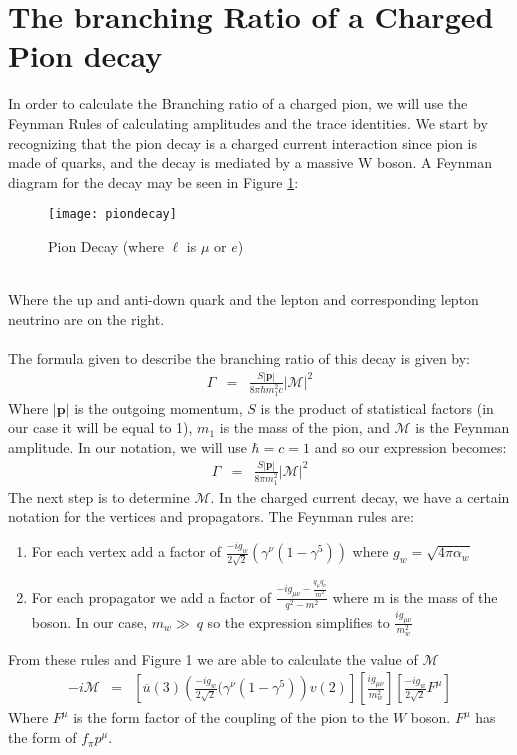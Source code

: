 \documentclass[12pt]{article}
\def \bea{\begin{eqnarray}}
\def \eea{\end{eqnarray}}
\def \({\left(}
\def \){\right)}
\def \[{\left[}
\def \]{\right]}
\def \ou{\overline{u}}
\def \al{\alpha}
\def \ga{\gamma}
\def \Ga{\Gamma}
\begin{document}
\section{The branching Ratio of a Charged Pion decay}
In order to calculate the Branching ratio of a charged pion, we will use the Feynman Rules of calculating amplitudes and the trace identities. We start by recognizing that the pion decay is a charged current interaction since pion is made of quarks, and the decay is mediated by a massive W boson. A Feynman diagram for the decay may be seen in Figure \ref{fig:piondecay}: 
\begin{figure}[h]
\centering
\texttt{[image: piondecay]}
\caption{Pion Decay (where $\ell$ is $\mu$ or $e$)}
\label{fig:piondecay}
\end{figure}\\
Where the up and anti-down quark and the lepton and corresponding lepton neutrino are on the right.  \\
\\
The formula given to describe the branching ratio of this decay is given by\cite{Griffiths}: 
\bea 
\Ga &=& \frac{S|\textbf{p}|}{8\pi\hbar m_1^2c} |\mathcal{M}|^2
\eea 
Where $|\textbf{p}|$ is the outgoing momentum, $S$ is the product of statistical factors (in our case it will be equal to 1), $m_1$ is the mass of the pion, and $\mathcal{M}$ is the Feynman amplitude. In our notation, we will use $\hbar= c=1$ and  so our expression becomes: 
\bea 
\Ga &=& \frac{S|\textbf{p}|}{8\pi m_1^2} |\mathcal{M}|^2
\eea 
The next step is to determine $\mathcal{M}$. In the charged current decay, we have a certain notation for the vertices and propagators. The Feynman rules are:
\begin{enumerate}
    \item For each vertex add a factor of $\frac{-ig_w}{2\sqrt{2}}(\ga^\nu(1-\ga^5))$ where $g_w= \sqrt{4\pi\al_w}$
    \item For each propagator we add a factor of $\frac{-ig_{\mu\nu}-\frac{q_\mu q_\nu}{m^2}}{q^2-m^2}$ where m is the mass of the boson. In our case, $m_w \gg\ q$ so the expression simplifies to $\frac{ig_{\mu\nu}}{m_w^2}$
\end{enumerate}
From these rules and Figure 1 we are able to calculate the value of $\mathcal{M}$ 
\bea
-i\mathcal{M}&=&\[\ou(3)\(\frac{-ig_w}{2\sqrt{2}}(\ga^\nu(1-\ga^5)\)v(2)\] \[\frac{ig_{\mu\nu}}{m_w^2} \]\[\frac{-ig_w}{2\sqrt{2}}F^\mu\]
\eea
Where $F^\mu$ is the form factor of the coupling of the pion to the $W$ boson. $F^\mu$ has the form of $f_\pi p^\mu$. 
\end{document}
